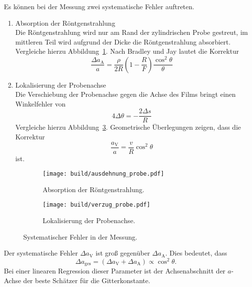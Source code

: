 Es können bei der Messung zwei systematische Fehler auftreten.
\begin{enumerate}
  \item\label{item:absorption} Absorption der Röntgenstrahlung \\
    Die Röntgenstrahlung wird nur am Rand der zylindrischen Probe gestreut,
    im mittleren Teil wird aufgrund der Dicke die Röntgenstrahlung absorbiert.
    Vergleiche hierzu Abbildung~\ref{fig:fehler_absorption}.
    Nach Bradley und Jay\cite{bradleyjay} lautet die Korrektur
    \begin{equation}
      \label{eq:korrektur_lokalisation}
      \frac{\Delta a_\text{A}}{a} = \frac{\rho}{2R}\left(1 - \frac{R}{F}\right) \frac{\cos^2\!\theta}{\theta}
    \end{equation}
  \item\label{item:lokalisierung} Lokalisierung der Probenachse \\
    Die Verschiebung der Probenachse gegen die Achse des Films bringt
    einen Winkelfehler von
    \begin{equation}
      4 \Delta \theta = -\frac{2 \Delta s}{R}
    \end{equation}
    Vergleiche hierzu Abbildung~\ref{fig:fehler_lokalisation}.
    Geometrische Überlegungen zeigen, dass die Korrektur
    \begin{equation}
      \frac{a_\text{V}}{a} = \frac{v}{R} \cos^2\!{\theta}
    \end{equation}
    ist.
\end{enumerate}

\begin{figure}
  \centering
  \begin{subfigure}[b]{0.48\textwidth}
    \centering
    \texttt{[image: build/ausdehnung\_probe.pdf]}
    \caption{%
      Absorption der Röntgenstrahlung.
    }%
    \label{fig:fehler_absorption}
  \end{subfigure}
  \begin{subfigure}[b]{0.48\textwidth}
    \centering
    \texttt{[image: build/verzug\_probe.pdf]}
    \caption{%
      Lokalisierung der Probenachse.
    }%
    \label{fig:fehler_lokalisation}
  \end{subfigure}
  \caption{%
    Systematischer Fehler in der Messung.\cite{anleitung}
  }
\end{figure}

Der systematische Fehler $\Delta a_\text{V}$ ist groß gegenüber $\Delta a_\text{A}$.
Dies bedeutet, dass
\begin{equation}
  \Delta a_\text{ges} = \left(\Delta a_\text{V} + \Delta a_\text{A}\right) \propto \cos^2\!{\theta}.
\end{equation}
Bei einer linearen Regression dieser Parameter ist
der Achsenabschnitt der $a$-Achse der beste Schätzer für die Gitterkonstante.

